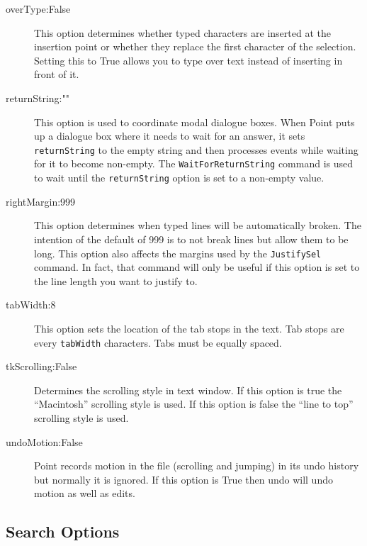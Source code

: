 \begin{description}
\item[overType:False]
This option determines whether typed characters are inserted
at the insertion point or whether they replace the first character
of the selection.
Setting this to True allows you to type over text instead of inserting
in front of it.

\item[returnString:""]
This option is used to coordinate modal dialogue boxes.
When Point puts up a dialogue box where it needs to wait for 
an answer, it sets {\tt returnString} to the empty string and
then processes events while waiting for it to become non-empty.
The {\tt WaitForReturnString} command is used to wait until the
{\tt returnString} option is set to a non-empty value.

\item[rightMargin:999]
This option determines when typed lines will be automatically broken.
The intention of the default of 999 is to not break lines but allow
them to be long.
This option also affects the margins used by the {\tt JustifySel} command.
In fact, that command will only be useful if this option is set to the
line length you want to justify to.

\item[tabWidth:8]
This option sets the location of the tab stops in the text.
Tab stops are every {\tt tabWidth} characters.
Tabs must be equally spaced.

\item[tkScrolling:False]
Determines the scrolling style in text window.
If this option is true the ``Macintosh'' scrolling style is used.
If this option is false the ``line to top'' scrolling style is used.

\item[undoMotion:False]
Point records motion in the file (scrolling and jumping) in its
undo history but normally it is ignored.
If this option is True then undo will undo motion as well
as edits.

\end{description}



\subsection{Search Options}

